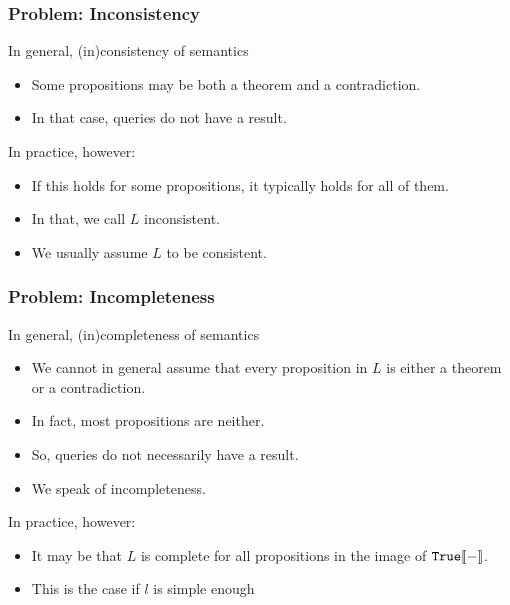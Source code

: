\documentclass{beamer}
\begin{document}
\begin{frame}\frametitle{Problem: Inconsistency}
In general, (in)consistency of semantics
\begin{itemize}
\item Some propositions may be both a theorem and a contradiction.
\item In that case, queries do not have a result.
\end{itemize}

In practice, however:
\begin{itemize}
\item If this holds for some propositions, it typically holds for all of them.
\item In that, we call $L$ inconsistent.
\item We usually assume $L$ to be consistent.
\end{itemize}
\end{frame}


\begin{frame}\frametitle{Problem: Incompleteness}
In general, (in)completeness of semantics
\begin{itemize}
\item We cannot in general assume that every proposition in $L$ is either a theorem or a contradiction.
\item In fact, most propositions are neither.
\item So, queries do not necessarily have a result.
\item We speak of incompleteness. 
\end{itemize}

In practice, however:
\begin{itemize}
\item It may be that $L$ is complete for all propositions in the image of $\mathtt{True}\llbracket -\rrbracket$.
\item This is the case if $l$ is simple enough 
\end{itemize}
\end{frame}
\end{document}
